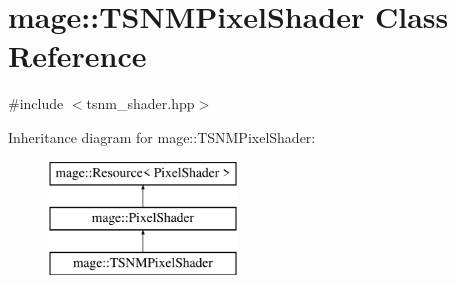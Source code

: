 \hypertarget{classmage_1_1_t_s_n_m_pixel_shader}{}\section{mage\+:\+:T\+S\+N\+M\+Pixel\+Shader Class Reference}
\label{classmage_1_1_t_s_n_m_pixel_shader}


{\ttfamily \#include $<$tsnm\+\_\+shader.\+hpp$>$}

Inheritance diagram for mage\+:\+:T\+S\+N\+M\+Pixel\+Shader\+:\begin{figure}[H]
\begin{center}
\leavevmode
\includegraphics[height=3.000000cm]{classmage_1_1_t_s_n_m_pixel_shader}
\end{center}
\end{figure}
